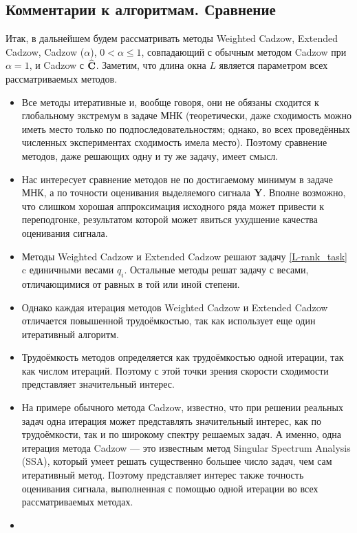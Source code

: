 \documentclass[12pt,a4paper,fleqn,leqno]{article}
\begin{document}
\subsection{Комментарии к алгоритмам. Сравнение}

Итак, в дальнейшем будем рассматривать методы
Weighted Cadzow, Extended Cadzow, Cadzow ($\alpha$), $0< \alpha \leq 1$, совпадающий с обычным методом Cadzow при $\alpha=1$,
и Cadzow с $\widehat {\mathbf{C}}$.
Заметим, что длина окна $L$ является параметром всех рассматриваемых методов.

\begin{itemize}
\item
Все методы итеративные и, вообще говоря, они не обязаны сходится к глобальному экстремум в задаче МНК  (теоретически, даже сходимость можно иметь место только по подпоследовательностям; однако, во всех проведённых численных экспериментах сходимость имела место). Поэтому сравнение методов, даже
решающих одну и ту же задачу, имеет смысл. 
\item
Нас интересует сравнение методов не по достигаемому минимум в задаче МНК, а по точности оценивания выделяемого сигнала $\mathbf{Y}$.
Вполне возможно, что слишком хорошая аппроксимация исходного ряда может привести к переподгонке, результатом которой
может явиться ухудшение качества оценивания сигнала.
\item
Методы Weighted Cadzow и Extended Cadzow решают задачу \eqref{L-rank_task} c единичными весами $q_i$. Остальные методы решат задачу с весами, отличающимися от равных в той или иной степени.
\item
Однако каждая итерация методов Weighted Cadzow и Extended Cadzow отличается повышенной трудоёмкостью, так как использует
еще один итеративный алгоритм.
\item
Трудоёмкость методов определяется как трудоёмкостью одной итерации, так как числом итераций. Поэтому с этой точки зрения скорости сходимости представляет значительный интерес.
\item
На примере обычного метода Cadzow, известно, что при решении реальных задач одна итерация может представлять значительный интерес, как по трудоёмкости, так и по широкому спектру решаемых задач. А именно, одна итерация метода Cadzow --- это известным метод Singular Spectrum Analysis (SSA), который умеет решать существенно большее число задач, чем сам итеративный метод. Поэтому представляет интерес также точность оценивания сигнала, выполненная с помощью одной итерации во всех рассматриваемых методах.
\item 

\end{itemize}
\end{document}
